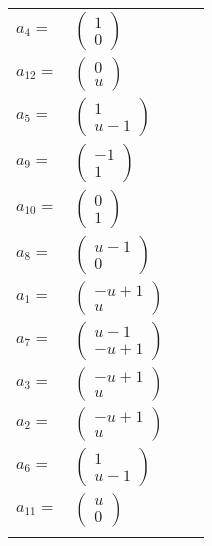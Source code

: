 \documentclass[1p]{elsarticle_modified}
\theoremstyle{definition}
\begin{document}
\begin{tabular}{m{7pt} m{180pt} m{7pt} m{180pt} }
\flushright $a_{4}=$&$\begin{pmatrix}1\\0\end{pmatrix}$ \\
\flushright $a_{12}=$&$\begin{pmatrix}0\\u\end{pmatrix}$ \\
\flushright $a_{5}=$&$\begin{pmatrix}1\\u-1\end{pmatrix}$ \\
\flushright $a_{9}=$&$\begin{pmatrix}-1\\1\end{pmatrix}$ \\
\flushright $a_{10}=$&$\begin{pmatrix}0\\1\end{pmatrix}$ \\
\flushright $a_{8}=$&$\begin{pmatrix}u-1\\0\end{pmatrix}$ \\
\flushright $a_{1}=$&$\begin{pmatrix}- u+1\\u\end{pmatrix}$ \\
\flushright $a_{7}=$&$\begin{pmatrix}u-1\\- u+1\end{pmatrix}$ \\
\flushright $a_{3}=$&$\begin{pmatrix}- u+1\\u\end{pmatrix}$ \\
\flushright $a_{2}=$&$\begin{pmatrix}- u+1\\u\end{pmatrix}$ \\
\flushright $a_{6}=$&$\begin{pmatrix}1\\u-1\end{pmatrix}$ \\
\flushright $a_{11}=$&$\begin{pmatrix}u\\0\end{pmatrix}$\\&\end{tabular}
\end{document}
